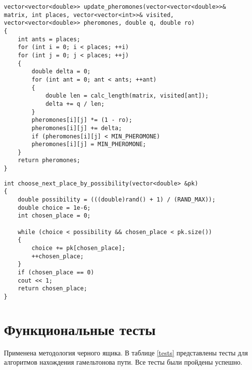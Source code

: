 \begin{center}
	\begin{lstlisting}[label=listing_pher,caption=алгоритм обновления матрицы феромонов]
vector<vector<double>> update_pheromones(vector<vector<double>>& matrix, int places, vector<vector<int>>& visited, vector<vector<double>> pheromones, double q, double ro)
{
	int ants = places;
	for (int i = 0; i < places; ++i)
	for (int j = 0; j < places; ++j)
	{
		double delta = 0;
		for (int ant = 0; ant < ants; ++ant)
		{
			double len = calc_length(matrix, visited[ant]);
			delta += q / len;
		}
		pheromones[i][j] *= (1 - ro);
		pheromones[i][j] += delta;
		if (pheromones[i][j] < MIN_PHEROMONE)
		pheromones[i][j] = MIN_PHEROMONE;
	}
	return pheromones;
}
	\end{lstlisting}
\end{center}

\clearpage

\begin{center}
	\begin{lstlisting}[label=lst:end,caption=Алгоритм выбора следующего города]
int choose_next_place_by_possibility(vector<double> &pk)
{
	double possibility = (((double)rand() + 1) / (RAND_MAX));
	double choice = 1e-6;
	int chosen_place = 0;
	
	while (choice < possibility && chosen_place < pk.size())
	{
		choice += pk[chosen_place];
		++chosen_place;
	}
	if (chosen_place == 0)
	cout << 1;
	return chosen_place;
}
	\end{lstlisting}
\end{center}

\section{Функциональные тесты}

Применена методология черного ящика. В таблице \ref{tests} представлены тесты для алгоритмов нахождения гамельтонова пути. 
Все тесты были пройдены успешно.

